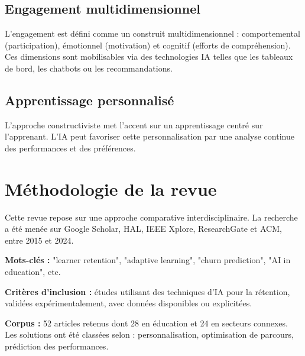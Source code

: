 \documentclass[12pt]{article}
\begin{document}
\subsection*{Engagement multidimensionnel}
L’engagement est défini comme un construit multidimensionnel : comportemental (participation), émotionnel (motivation) et cognitif (efforts de compréhension). Ces dimensions sont mobilisables via des technologies IA telles que les tableaux de bord, les chatbots ou les recommandations.

\subsection*{Apprentissage personnalisé}
L’approche constructiviste met l’accent sur un apprentissage centré sur l’apprenant. L’IA peut favoriser cette personnalisation par une analyse continue des performances et des préférences.

\section{Méthodologie de la revue}
Cette revue repose sur une approche comparative interdisciplinaire. La recherche a été menée sur Google Scholar, HAL, IEEE Xplore, ResearchGate et ACM, entre 2015 et 2024.

\textbf{Mots-clés :} "learner retention", "adaptive learning", "churn prediction", "AI in education", etc.

\textbf{Critères d’inclusion :} études utilisant des techniques d’IA pour la rétention, validées expérimentalement, avec données disponibles ou explicitées.

\textbf{Corpus :} 52 articles retenus dont 28 en éducation et 24 en secteurs connexes. Les solutions ont été classées selon : personnalisation, optimisation de parcours, prédiction des performances.

\end{document}
